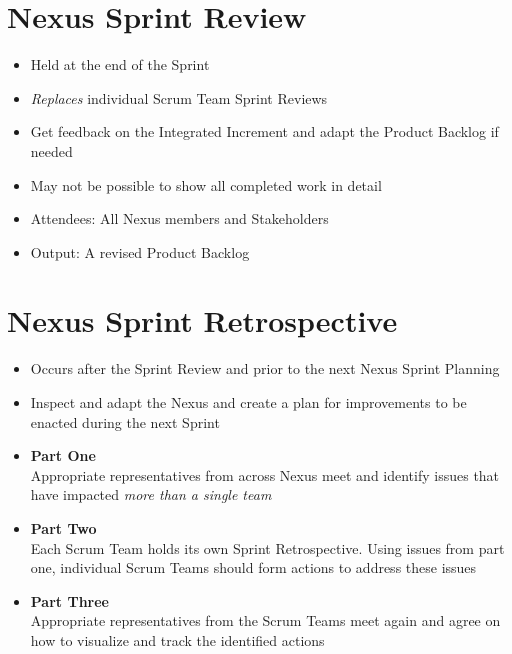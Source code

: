 \documentclass[a4paper,11pt,twocolumn]{article}
\begin{document}

\section*{Nexus Sprint Review}
\begin{itemize}
	\item Held at the end of the Sprint
	\item \textit{Replaces} individual Scrum Team Sprint Reviews
	\item Get feedback on the Integrated Increment and adapt the Product Backlog if needed
	\item May not be possible to show all completed work in detail
	\item Attendees: All Nexus members and Stakeholders
	\item Output: A revised Product Backlog
\end{itemize}

\section*{Nexus Sprint Retrospective}
\begin{itemize}
	\item Occurs after the Sprint Review and prior to the next Nexus Sprint Planning
	\item Inspect and adapt the Nexus and create a plan for improvements to be enacted during the next Sprint
	\item \textbf{Part One}\\
	Appropriate representatives from across Nexus meet and identify issues that have impacted \textit{more than a single team}
	\item \textbf{Part Two}\\
	Each Scrum Team holds its own Sprint Retrospective. Using issues from part one, individual Scrum Teams should form actions to address these issues
	\item \textbf{Part Three}\\
	Appropriate representatives from the Scrum Teams meet again and agree on how to visualize and track the identified actions
\end{itemize}
\end{document}

